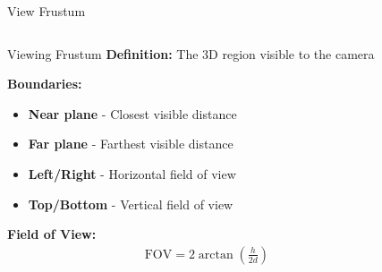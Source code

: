 \begin{frame}{View Frustum}
    \begin{columns}
        \begin{column}{0.5\textwidth}
            \begin{mathbox}{Viewing Frustum}
                \textbf{Definition:} The 3D region visible to the camera
                
                \textbf{Boundaries:}
                \begin{itemize}
                    \item \textbf{Near plane} - Closest visible distance
                    \item \textbf{Far plane} - Farthest visible distance  
                    \item \textbf{Left/Right} - Horizontal field of view
                    \item \textbf{Top/Bottom} - Vertical field of view
                \end{itemize}
                
                \textbf{Field of View:}
                \begin{align}
                    \text{FOV} = 2 \arctan\left(\frac{h}{2d}\right)
                \end{align}
            \end{mathbox}
        \end{column}
        \begin{column}{0.5\textwidth}
\end{column}
\end{columns}
\end{frame}
